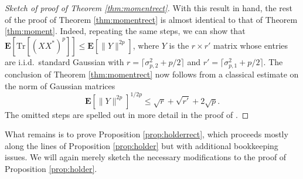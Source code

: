 \documentclass[10pt,reqno]{amsart}
\theoremstyle{definition}
\numberwithin{equation}{section}
\numberwithin{figure}{section}
\numberwithin{table}{section}
\begin{document}
\begin{proof}[Sketch of proof of Theorem \ref{thm:momentrect}]
With this result in hand, the rest of the proof of Theorem 
\ref{thm:momentrect} is almost identical to that of Theorem 
\ref{thm:moment}. Indeed, repeating the same steps, we
can show that $\mathbf{E}[\mathrm{Tr}[(XX^*)^p]]\le
\mathbf{E}[\|Y\|^{2p}]$, where $Y$ is the $r\times r'$ matrix
whose entries are i.i.d.\ standard Gaussian with 
$r=\lceil\sigma_{p,2}^2+p/2\rceil$
and $r'=\lceil\sigma_{p,1}^2+p/2\rceil$. The conclusion of
Theorem \ref{thm:momentrect} now follows from a classical estimate on the 
norm of Gaussian matrices
$$
	\mathbf{E}[\|Y\|^{2p}]^{1/2p} \le \sqrt{r}+\sqrt{r'} + 2\sqrt{p}.
$$
The omitted steps are spelled out in more detail in
the proof of \cite[Theorem 3.1]{BvH16}.
\end{proof}

What remains is to prove Proposition \ref{prop:holderrect}, which proceeds 
mostly along the lines of Proposition \ref{prop:holder} but with 
additional bookkeeping issues. We will again merely sketch the necessary 
modifications to the proof of Proposition \ref{prop:holder}.
\end{document}
